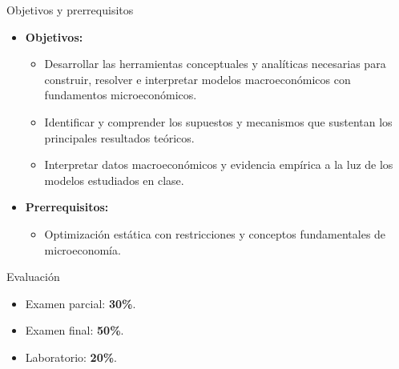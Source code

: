 \documentclass[aspectratio=169,11pt]{beamer}
\begin{document}
\begin{frame}{Objetivos y prerrequisitos}

\small

\begin{itemize}
  \setlength{\itemsep}{0.65em}

  \item \textbf{Objetivos:}
  \begin{itemize}
    \setlength{\itemsep}{0.25em}

    \item Desarrollar las herramientas conceptuales y analíticas necesarias
    para construir, resolver e interpretar modelos macroeconómicos con
    fundamentos microeconómicos.

    \item Identificar y comprender los supuestos y mecanismos que sustentan
    los principales resultados teóricos.

    \item Interpretar datos macroeconómicos y evidencia empírica a la luz de
    los modelos estudiados en clase.
  \end{itemize}

  \item \textbf{Prerrequisitos:}
  \begin{itemize}

    \item Optimización estática con restricciones y conceptos fundamentales de microeconomía.

  \end{itemize}
\end{itemize}

\end{frame}



\begin{frame}{Evaluación}
  \begin{itemize}
    \item Examen parcial: \textbf{30\%}.
    \item Examen final: \textbf{50\%}.
    \item Laboratorio: \textbf{20\%}.
  \end{itemize}
\end{frame}
\end{document}

